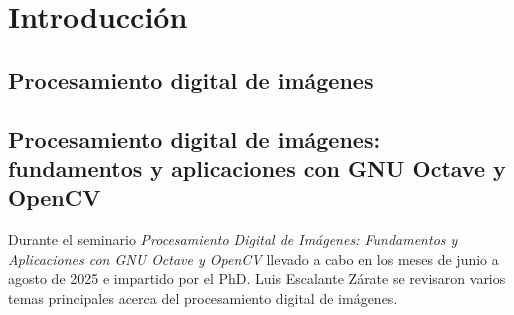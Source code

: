 \chapter{Introducción}

\section{Procesamiento digital de imágenes}

\section{Procesamiento digital de imágenes: fundamentos y aplicaciones con GNU Octave y OpenCV}
Durante el seminario \textit{Procesamiento Digital de Imágenes: Fundamentos y Aplicaciones con GNU Octave y OpenCV} llevado a cabo en los meses de junio a agosto de 2025 e impartido por el PhD. Luis Escalante Zárate se revisaron varios temas principales acerca del procesamiento digital de imágenes.